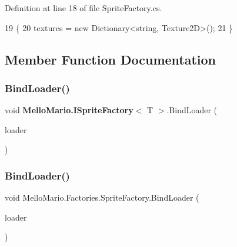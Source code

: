 Definition at line 18 of file Sprite\+Factory.\+cs.


\begin{DoxyCode}
19         \{
20             textures = \textcolor{keyword}{new} Dictionary<string, Texture2D>();
21         \}
\end{DoxyCode}


\subsection{Member Function Documentation}
\mbox{\label{interfaceMelloMario_1_1ISpriteFactory_afbb364623bed7f0cb974a7d73b8ac39f}} 
\subsubsection{Bind\+Loader()\hspace{0.1cm}{\footnotesize\ttfamily [1/2]}}
{\footnotesize\ttfamily void \textbf{ Mello\+Mario.\+I\+Sprite\+Factory}$<$ T $>$.Bind\+Loader (\begin{DoxyParamCaption}\item[{T}]{loader }\end{DoxyParamCaption})\hspace{0.3cm}{\ttfamily [inherited]}}

\mbox{\label{classMelloMario_1_1Factories_1_1SpriteFactory_a2f683f3af0e86a7c3de382a9d26c5cba}} 
\subsubsection{Bind\+Loader()\hspace{0.1cm}{\footnotesize\ttfamily [2/2]}}
{\footnotesize\ttfamily void Mello\+Mario.\+Factories.\+Sprite\+Factory.\+Bind\+Loader (\begin{DoxyParamCaption}\item[{Content\+Manager}]{loader }\end{DoxyParamCaption})}



